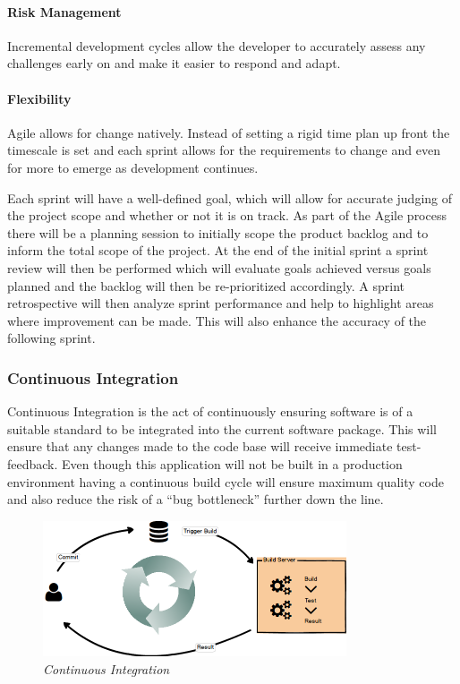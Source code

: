 \documentclass{article}
\begin{document}
\paragraph{Risk Management} Incremental development cycles allow the developer to accurately assess any challenges early on and make it easier to respond and adapt.

\paragraph{Flexibility} Agile allows for change natively. Instead of setting a rigid time plan up front the timescale is set and each sprint allows for the requirements to change and even for more to emerge as development continues.

Each sprint will have a well-defined goal, which will allow for accurate judging of the project scope and whether or not it is on track. As part of the Agile process there will be a planning session to initially scope the product backlog and to inform the total scope of the project. At the end of the initial sprint a sprint review will then be performed which will evaluate goals achieved versus goals planned and the backlog will then be re-prioritized accordingly. A sprint retrospective will then analyze sprint performance and help to highlight areas where improvement can be made. This will also enhance the accuracy of the following sprint.

\subsubsection{Continuous Integration}
Continuous Integration is the act of continuously ensuring software is of a suitable standard to be integrated into the current software package. This will ensure that any changes made to the code base will receive immediate test-feedback. Even though this application will not be built in a production environment having a continuous build cycle will ensure maximum quality code and also reduce the risk of a ``bug bottleneck'' further down the line.

\begin{figure}[!h]
\centering
\includegraphics*[width=0.8\textwidth]{images/CI}
\caption{\em Continuous Integration}
\label{fig:CI}
\end{figure}
\end{document}
